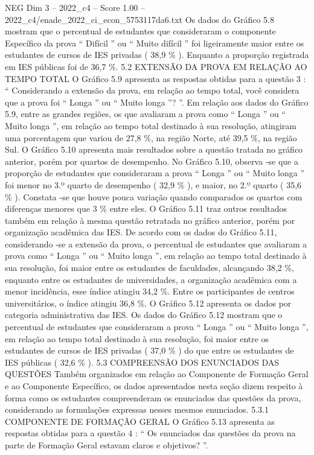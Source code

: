 \begin{textsample}{NEG Dim 3 – 2022\_c4 – Score 1.00 – 2022\_c4/enade\_2022\_ci\_econ\_5753117da6.txt}
Os dados do Gráfico 5.8 mostram que o percentual de estudantes que consideraram o componente Específico da prova “ Difícil ” ou “ Muito difícil ” foi ligeiramente maior entre os estudantes de cursos de IES privadas ( 38,9 \% ).
Enquanto a proporção registrada em IES públicas foi de 36,7 \%. 5.2 EXTENSÃO DA PROVA EM RELAÇÃO AO TEMPO TOTAL O Gráfico 5.9 apresenta as respostas obtidas para a questão 3 : “ Considerando a extensão da prova, em relação ao tempo total, você considera que a prova foi “ Longa ” ou “ Muito longa ”? ”.
Em relação aos dados do Gráfico 5.9, entre as grandes regiões, os que avaliaram a prova como “ Longa ” ou “ Muito longa ”, em relação ao tempo total destinado à sua resolução, atingiram uma porcentagem que variou de 27,8 \%, na região Norte, até 39,5 \%, na região Sul.
O Gráfico 5.10 apresenta mais resultados sobre a questão tratada no gráfico anterior, porém por quartos de desempenho.
No Gráfico 5.10, observa -se que a proporção de estudantes que consideraram a prova “ Longa ” ou “ Muito longa ” foi menor no 3.º quarto de desempenho ( 32,9 \% ), e maior, no 2.º quarto ( 35,6 \% ).
Constata -se que houve pouca variação quando comparados os quartos com diferenças menores que 3 \% entre eles.
O Gráfico 5.11 traz outros resultados também em relação à mesma questão retratada no gráfico anterior, porém por organização acadêmica das IES.
De acordo com os dados do Gráfico 5.11, considerando -se a extensão da prova, o percentual de estudantes que avaliaram a prova como “ Longa ” ou “ Muito longa ”, em relação ao tempo total destinado à sua resolução, foi maior entre os estudantes de faculdades, alcançando 38,2 \%, enquanto entre os estudantes de universidades, a organização acadêmica com a menor incidência, esse índice atingiu 34,2 \%.
Entre os participantes de centros universitários, o índice atingiu 36,8 \%.
O Gráfico 5.12 apresenta os dados por categoria administrativa das IES.
Os dados do Gráfico 5.12 mostram que o percentual de estudantes que consideraram a prova “ Longa ” ou “ Muito longa ”, em relação ao tempo total destinado à sua resolução, foi maior entre os estudantes de cursos de IES privadas ( 37,0 \% ) do que entre os estudantes de IES públicas ( 32,6 \% ). 5.3 COMPREENSÃO DOS ENUNCIADOS DAS QUESTÕES Também organizados em relação ao Componente de Formação Geral e ao Componente Específico, os dados apresentados nesta seção dizem respeito à forma como os estudantes compreenderam os enunciados das questões da prova, considerando as formulações expressas nesses mesmos enunciados. 5.3.1 COMPONENTE DE FORMAÇÃO GERAL O Gráfico 5.13 apresenta as respostas obtidas para a questão 4 : “ Os enunciados das questões da prova na parte de Formação Geral estavam claros e objetivos? ”.

\end{textsample}
